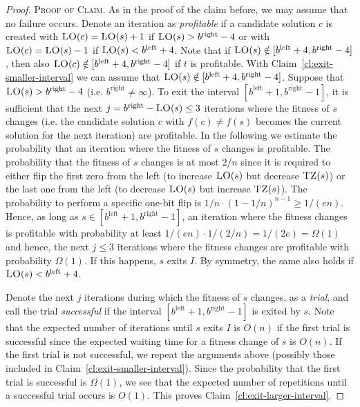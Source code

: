 \documentclass[
sigconf = false, %
review = false, %
screen = true, %
anonymous = true, %
format=acmsmall
]{acmart}
\newcommand{\LO}{\textsc{LO}\xspace}                      %
\newcommand{\TZ}{\textsc{TZ}\xspace}
\newenvironment{proofofclaim}{\textsc{Proof of Claim.}}{\hfill\scriptsize\scalebox{1}{$\blacksquare$}}
\begin{document}
\begin{proof}
    \begin{proofofclaim}
    As in the proof of the claim before, we may assume that no failure occurs. Denote an iteration as \emph{profitable} if a candidate solution $c$ is created with $\LO(c) = \LO(s)+1$ if $\LO(s) > b^{\text{right}} - 4$ or with $\LO(c)=\LO(s)-1$ if $\LO(s) < b^{\text{left}} + 4$. Note that if $\LO(s) \notin [b^{\text{left}} +4,b^{\text{right}} - 4]$, then also $\LO(c) \notin [b^{\text{left}} +4,b^{\text{right}} - 4]$ if $t$ is profitable.
    With Claim~\ref{cl:exit-smaller-interval} we can assume that $\LO(s) \notin [b^{\text{left}} +4,b^{\text{right}} - 4]$. Suppose that $\LO(s) > b^{\text{right}} - 4$ (i.e. $b^{\text{right}} \neq \infty$). To exit the interval $[b^{\text{left}}+1,b^{\text{right}} - 1]$, it is sufficient that the next $j = b^{\text{right}} - \LO(s) \leq 3$ iterations where the fitness of $s$ changes (i.e. the candidate solution $c$ with $f(c) \neq f(s)$ becomes the current solution for the next iteration) are profitable. In the following we estimate the probability that an iteration where the fitness of $s$ changes is profitable. The probability that the fitness of $s$ changes is at most $2/n$  since it is required to either flip the first zero from the left (to increase $\LO(s)$ but decrease $\TZ(s)$) or the last one from the left (to decrease $\LO(s)$ but increase $\TZ(s)$). The probability to perform a specific one-bit flip is $1/n \cdot (1-1/n)^{n-1} \geq 1/(en)$. Hence, as long as $s \in [b^{\text{left}} +1,b^{\text{right}} - 1]$, an iteration where the fitness changes is profitable with probability at least $1/(en) \cdot 1/(2/n) = 1/(2e) = \Omega(1)$ and hence, the next $j \leq 3$ iterations where the fitness changes are profitable with probability $\Omega(1)$. If this happens, $s$ exits $I$. By symmetry, the same also holds if $\LO(s) < b^{\text{left}} + 4$.
    
    Denote the next $j$ iterations during which the fitness of $s$ changes, as a \emph{trial}, and call the trial \emph{successful} if the interval $[b^{\text{left}} +1,b^{\text{right}} - 1]$ is exited by $s$. Note that the expected number of iterations until $s$ exits $I$ is $O(n)$ if the first trial is successful since the expected waiting time for a fitness change of $s$ is $O(n)$. If the first trial is not successful, we repeat the arguments above (possibly those included in Claim~\ref{cl:exit-smaller-interval}). Since the probability that the first trial is successful is $\Omega(1)$, we see that the expected number of repetitions until a successful trial occurs is $O(1)$. This proves Claim~\ref{cl:exit-larger-interval}. 
    \end{proofofclaim}


\end{proof}
\end{document}
